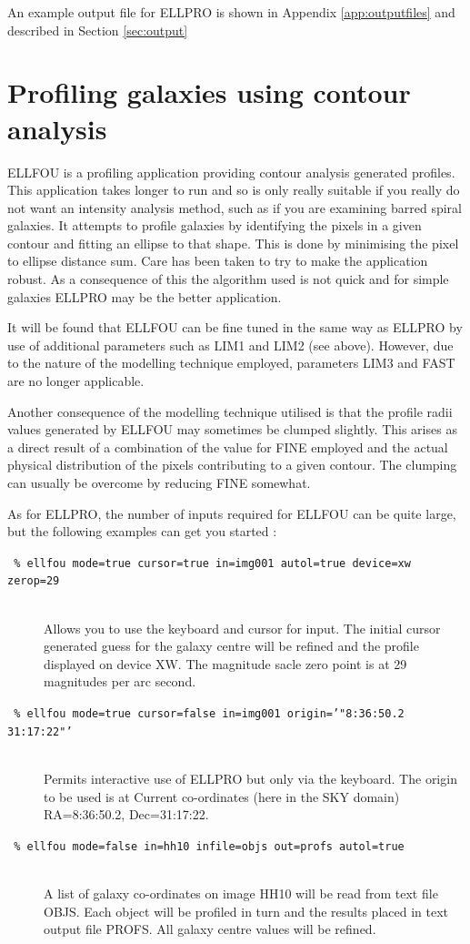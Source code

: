 \documentclass[twoside,11pt]{article}
\newcommand{\xlabel}[1]{}
\begin{document}
An example output file for ELLPRO is shown in Appendix \ref{app:outputfiles}
and described in Section \ref{sec:output}

\section{Profiling galaxies using contour analysis}
\xlabel{ELLFOU}
\label{sec:profc}

ELLFOU is a profiling application providing contour analysis generated profiles.
This application takes longer to run and so is only really suitable if you
really do not want an intensity analysis method, such as if you are
examining barred spiral galaxies. It attempts to profile galaxies by identifying
the pixels in a given contour and fitting an ellipse to that shape. This is
done by minimising the pixel to ellipse distance sum. Care has been taken
to try to make the application robust. As a consequence of this the algorithm
used is not quick and for simple galaxies ELLPRO may be the better application.

It will be found that ELLFOU can be fine tuned in the same way as ELLPRO
by use of additional parameters such as LIM1 and LIM2 (see above). However,
due to the nature of the modelling technique employed, parameters LIM3
and FAST are no longer applicable.

Another consequence of the modelling technique utilised is that the profile
radii values generated by ELLFOU may sometimes be clumped slightly.
This arises as a direct result of a combination of the value for FINE
employed and the actual physical distribution of the pixels contributing
to a given contour. The clumping can usually be overcome by reducing FINE
somewhat.

As for ELLPRO, the number of inputs required for ELLFOU can be quite large,
but the following examples can get you started :

\begin{description}
\item[{\tt
   \% ellfou mode=true cursor=true in=img001 autol=true device=xw zerop=29}]
   \mbox{}\\
  Allows you to use the keyboard and cursor for input. The initial cursor
  generated guess for the galaxy centre will be refined and the profile
  displayed on device XW.  The magnitude sacle zero point is at 29
  magnitudes per arc second.
\item[{\tt
   \% ellfou mode=true cursor=false in=img001 origin='"8:36:50.2 31:17:22"'}]
  \mbox{}\\
  Permits interactive use of ELLPRO but only via the keyboard. The origin
  to be used is at Current co-ordinates (here in the SKY domain)
  RA=8:36:50.2, Dec=31:17:22.
\item[{\tt
   \% ellfou mode=false in=hh10 infile=objs out=profs autol=true}]
   \mbox{}\\
  A list of galaxy co-ordinates on image HH10 will be read from text
  file OBJS. Each object will be profiled in turn and the results placed in
  text output file PROFS. All galaxy centre values will be refined.
\end{description}
\end{document}
